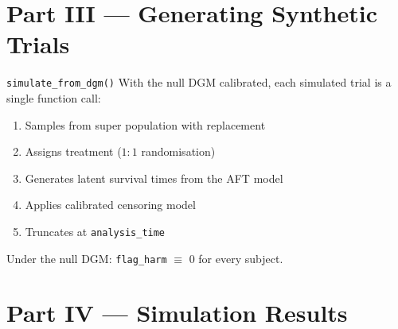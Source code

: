 \documentclass[
  11pt,
  ignorenonframetext,
  aspectratio=169,
]{beamer}
\providecommand{\tightlist}{%
  \setlength{\itemsep}{0pt}\setlength{\parskip}{0pt}}
\begin{document}
\section{Part III --- Generating Synthetic
Trials}\label{part-iii-generating-synthetic-trials}

\begin{frame}[fragile]{\texttt{simulate\_from\_dgm()}}
\protect{}\label{simulate_from_dgm}
With the null DGM calibrated, each simulated trial is a single function
call:

\begin{enumerate}
\tightlist
\item
  Samples from super population with replacement
\item
  Assigns treatment (\(1{:}1\) randomisation)
\item
  Generates latent survival times from the AFT model
\item
  Applies calibrated censoring model
\item
  Truncates at \texttt{analysis\_time}
\end{enumerate}

Under the null DGM: \texttt{flag\_harm} \(\equiv\) 0 for every subject.
\end{frame}

\section{Part IV --- Simulation
Results}\label{part-iv-simulation-results}
\end{document}
